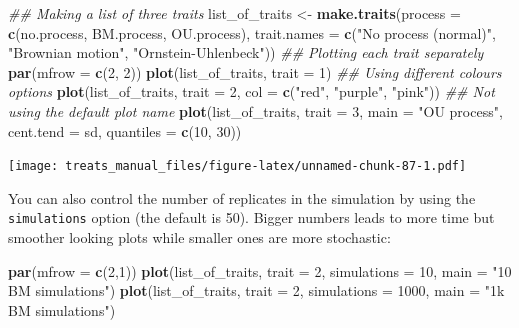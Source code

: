 \documentclass[
]{book}
\newenvironment{Shaded}{\begin{snugshade}}{\end{snugshade}}
\newcommand{\CommentTok}[1]{\textcolor[rgb]{0.56,0.35,0.01}{\textit{#1}}}
\newcommand{\DataTypeTok}[1]{\textcolor[rgb]{0.13,0.29,0.53}{#1}}
\newcommand{\DecValTok}[1]{\textcolor[rgb]{0.00,0.00,0.81}{#1}}
\newcommand{\KeywordTok}[1]{\textcolor[rgb]{0.13,0.29,0.53}{\textbf{#1}}}
\newcommand{\NormalTok}[1]{#1}
\newcommand{\StringTok}[1]{\textcolor[rgb]{0.31,0.60,0.02}{#1}}
\begin{document}
\begin{Shaded}
\begin{Highlighting}[]
\CommentTok{\#\# Making a list of three traits}
\NormalTok{list\_of\_traits \textless{}{-}}\StringTok{ }\KeywordTok{make.traits}\NormalTok{(}\DataTypeTok{process =} \KeywordTok{c}\NormalTok{(no.process, BM.process, OU.process), }\DataTypeTok{trait.names =} \KeywordTok{c}\NormalTok{(}\StringTok{"No process (normal)"}\NormalTok{, }\StringTok{"Brownian motion"}\NormalTok{, }\StringTok{"Ornstein{-}Uhlenbeck"}\NormalTok{))}
\CommentTok{\#\# Plotting each trait separately}
\KeywordTok{par}\NormalTok{(}\DataTypeTok{mfrow =} \KeywordTok{c}\NormalTok{(}\DecValTok{2}\NormalTok{, }\DecValTok{2}\NormalTok{))}
\KeywordTok{plot}\NormalTok{(list\_of\_traits, }\DataTypeTok{trait =} \DecValTok{1}\NormalTok{)}
\CommentTok{\#\# Using different colours options}
\KeywordTok{plot}\NormalTok{(list\_of\_traits, }\DataTypeTok{trait =} \DecValTok{2}\NormalTok{, }\DataTypeTok{col =} \KeywordTok{c}\NormalTok{(}\StringTok{"red"}\NormalTok{, }\StringTok{"purple"}\NormalTok{, }\StringTok{"pink"}\NormalTok{))}
\CommentTok{\#\# Not using the default plot name}
\KeywordTok{plot}\NormalTok{(list\_of\_traits, }\DataTypeTok{trait =} \DecValTok{3}\NormalTok{, }\DataTypeTok{main =} \StringTok{"OU process"}\NormalTok{,}
     \DataTypeTok{cent.tend =}\NormalTok{ sd, }\DataTypeTok{quantiles =} \KeywordTok{c}\NormalTok{(}\DecValTok{10}\NormalTok{, }\DecValTok{30}\NormalTok{))}
\end{Highlighting}
\end{Shaded}

\texttt{[image: treats\_manual\_files/figure-latex/unnamed-chunk-87-1.pdf]}

You can also control the number of replicates in the simulation by using the \texttt{simulations} option (the default is 50).
Bigger numbers leads to more time but smoother looking plots while smaller ones are more stochastic:

\begin{Shaded}
\begin{Highlighting}[]
\KeywordTok{par}\NormalTok{(}\DataTypeTok{mfrow =} \KeywordTok{c}\NormalTok{(}\DecValTok{2}\NormalTok{,}\DecValTok{1}\NormalTok{))}
\KeywordTok{plot}\NormalTok{(list\_of\_traits, }\DataTypeTok{trait =} \DecValTok{2}\NormalTok{, }\DataTypeTok{simulations =} \DecValTok{10}\NormalTok{, }\DataTypeTok{main =} \StringTok{"10 BM simulations"}\NormalTok{)}
\KeywordTok{plot}\NormalTok{(list\_of\_traits, }\DataTypeTok{trait =} \DecValTok{2}\NormalTok{, }\DataTypeTok{simulations =} \DecValTok{1000}\NormalTok{, }\DataTypeTok{main =} \StringTok{"1k BM simulations"}\NormalTok{)}
\end{Highlighting}
\end{Shaded}
\end{document}
